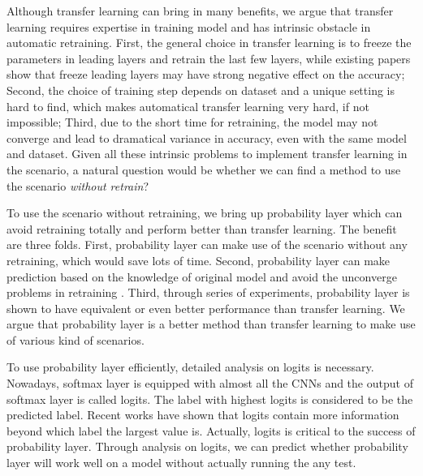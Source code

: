 \documentclass{article}
\begin{document}
Although transfer learning can bring in many benefits, we argue that transfer learning requires expertise in training model and has intrinsic obstacle in automatic retraining. First, the general choice in transfer learning is to freeze the parameters in leading layers and retrain the last few layers, while existing papers show that freeze leading layers may have strong negative effect on the accuracy; Second, the choice of training step depends on dataset and a unique setting is hard to find, which makes automatical transfer learning very hard, if not impossible;   Third, due to the short time for retraining, the model may not converge and lead to dramatical variance in accuracy, even with the same model and dataset. Given all these intrinsic problems to implement transfer learning in the scenario, a natural question would be whether we can find a method to use the scenario \textit{without retrain}?

To use the scenario without retraining, we bring up probability layer which can avoid retraining totally and perform better than transfer learning. The benefit are three folds. First, probability layer can make use of the scenario without any retraining, which would save lots of time. Second, probability layer can make prediction based on the knowledge of original model and avoid the unconverge problems in retraining . Third, through series of experiments, probability layer is shown to have equivalent or even better performance than transfer learning. We argue that probability layer is a better method than transfer learning to make use of various kind of scenarios. 

To use probability layer efficiently, detailed analysis on logits is necessary. Nowadays, softmax layer is equipped with almost all the CNNs and the output of softmax layer is called logits. The label with highest logits is considered to be the predicted label. Recent works have shown that logits contain more information beyond which label the largest value is. Actually, logits is critical to the success of probability layer. Through analysis on logits, we can predict whether probability layer will work well on a model without actually running the any test. 
\end{document}
